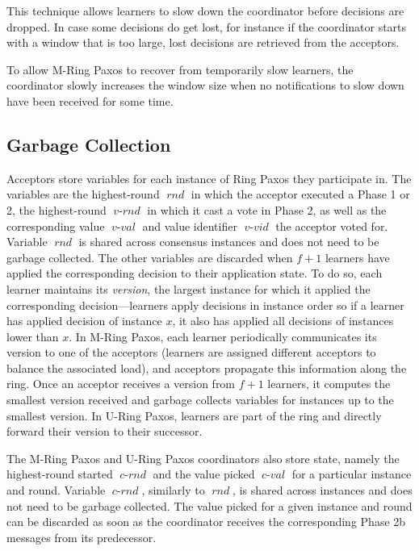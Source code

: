 \documentclass[final,3p,times,twocolumn,authoryear]{elsarticle}
\newcommand{\mv}[1]{\ensuremath{\operatorname{\mathit{#1}}}}
\begin{document}
This technique allows learners to slow down the coordinator before decisions are dropped. In case some decisions do get lost, for instance if the coordinator starts with a window that is too large, lost decisions are retrieved from the acceptors. 

To allow M-Ring Paxos to recover from temporarily slow learners, the coordinator slowly increases the window size when no notifications to slow down have been received for some time.


\subsection{Garbage Collection}
\label{sec:gc}

Acceptors store variables for each instance of Ring Paxos they participate in. The variables are the highest-round \mv{rnd} in which the acceptor executed a Phase 1 or 2, the highest-round \mv{v-rnd} in which it cast a vote in Phase 2, as well as the corresponding value \mv{v-val} and value identifier \mv{v-vid} the acceptor voted for.  Variable \mv{rnd} is shared across consensus instances and does not need to be garbage collected.  The other variables are discarded when $f+1$ learners have applied the corresponding decision to their application state.  To do so, each learner maintains its \emph{version}, the largest instance for which it applied the corresponding decision---learners apply decisions in instance order so if a learner has applied decision of instance $x$, it also has applied all decisions of instances lower than $x$.  In M-Ring Paxos, each learner periodically communicates its version to one of the acceptors (learners are assigned different acceptors to balance the associated load), and acceptors propagate this information along the ring.  Once an acceptor receives a version from $f+1$ learners, it computes the smallest version received and garbage collects variables for instances up to the smallest version.  In U-Ring Paxos, learners are part of the ring and directly forward their version to their successor.

The M-Ring Paxos and U-Ring Paxos coordinators also store state, namely the highest-round started \mv{c-rnd} and the value picked \mv{c-val} for a particular instance and round.  Variable \mv{c-rnd}, similarly to \mv{rnd}, is shared across instances and does not need to be garbage collected.  The value picked for a given instance and round can be discarded as soon as the coordinator receives the corresponding Phase 2b messages from its predecessor.
\end{document}
